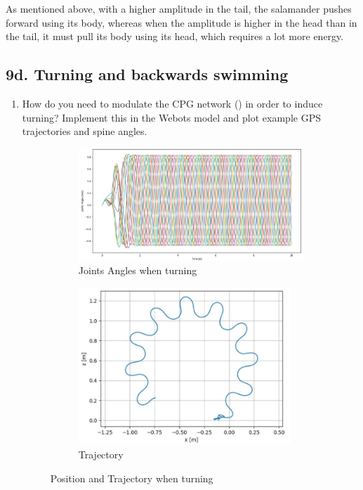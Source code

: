 \documentclass{cmc}
\begin{document}
As mentioned above, with a higher amplitude in the tail, the salamander pushes forward using its body, whereas when the amplitude is higher in the head than in the tail, it must pull its body using its head, which requires a lot more energy. 

\subsection*{9d. Turning and backwards swimming}
\label{sec:turning-backwards}

\begin{enumerate}
\item How do you need to modulate the CPG network ()
  in order to induce turning?  Implement this in the Webots model and
  plot example GPS trajectories and spine angles.
  
\begin{figure}[H]

\begin{subfigure}{0.5\textwidth}
\includegraphics[width=16cm]{9d1_pos.JPG}
\begin{center}
\caption{Joints Angles when turning}
\end{center}    
\label{fig:2_a_1}
\end{subfigure}    

\begin{center}
\begin{subfigure}{0.5\textwidth}
\includegraphics[width=8cm]{9d1_traj.JPG}
\caption{Trajectory}
\label{fig:2_a_2}
\end{subfigure}
 \end{center}
\caption{Position and Trajectory when turning}
\label{fig:9d1}
\end{figure}



\end{enumerate}
\end{document}

